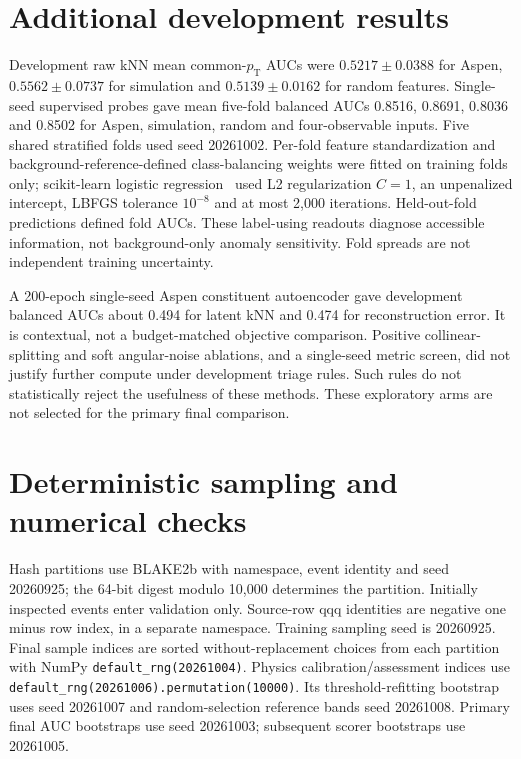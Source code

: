 \documentclass[11pt,a4paper]{article}
\newcommand{\pt}{p_{\mathrm T}}
\begin{document}
\section{Additional development results}
Development raw kNN mean common-$\pt$ AUCs were $0.5217\pm0.0388$ for Aspen,
$0.5562\pm0.0737$ for simulation and $0.5139\pm0.0162$ for random features.
Single-seed supervised probes gave mean five-fold balanced AUCs 0.8516, 0.8691,
0.8036 and 0.8502 for Aspen, simulation, random and four-observable inputs.
Five shared stratified folds used seed 20261002. Per-fold feature standardization
and background-reference-defined class-balancing weights were fitted on training
folds only; scikit-learn logistic regression~\cite{sklearn} used L2 regularization $C=1$, an unpenalized
intercept, LBFGS tolerance $10^{-8}$ and at most 2,000 iterations. Held-out-fold
predictions defined fold AUCs. These label-using readouts diagnose accessible
information, not background-only anomaly sensitivity. Fold spreads are not
independent training uncertainty.

A 200-epoch single-seed Aspen constituent autoencoder gave development balanced
AUCs about 0.494 for latent kNN and 0.474 for reconstruction error. It is contextual,
not a budget-matched objective comparison. Positive collinear-splitting and soft
angular-noise ablations, and a single-seed metric screen, did not justify
further compute under development triage rules. Such rules do not statistically
reject the usefulness of these methods. These exploratory arms are not selected
for the primary final comparison.

\section{Deterministic sampling and numerical checks}
Hash partitions use BLAKE2b with namespace, event identity and seed 20260925;
the 64-bit digest modulo 10,000 determines the partition. Initially inspected
events enter validation only. Source-row qqq identities are negative one minus row
index, in a separate namespace. Training sampling seed is 20260925. Final sample
indices are sorted without-replacement choices from each partition with NumPy
\texttt{default\_rng(20261004)}. Physics calibration/assessment indices use
\texttt{default\_rng(20261006).permutation(10000)}. Its threshold-refitting bootstrap
uses seed 20261007 and random-selection reference bands seed 20261008. Primary
final AUC bootstraps use seed 20261003; subsequent scorer bootstraps use 20261005.
\end{document}
